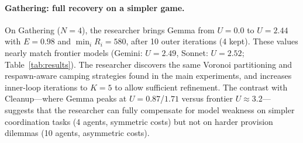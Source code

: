 \documentclass[sigconf,authordraft]{acmart}
\begin{document}
\paragraph{Gathering: full recovery on a simpler game.}
On Gathering ($N{=}4$), the researcher brings Gemma from $U{=}0.0$ to $U{=}2.44$ with $E{=}0.98$ and $\min_i R_i{=}580$, after 10 outer iterations (4 kept). These values nearly match frontier models (Gemini: $U{=}2.49$, Sonnet: $U{=}2.52$; Table~\ref{tab:results}). The researcher discovers the same Voronoi partitioning and respawn-aware camping strategies found in the main experiments, and increases inner-loop iterations to $K{=}5$ to allow sufficient refinement. The contrast with Cleanup---where Gemma peaks at $U{=}0.87$/$1.71$ versus frontier $U{\approx}3.2$---suggests that the researcher can fully compensate for model weakness on simpler coordination tasks (4 agents, symmetric costs) but not on harder provision dilemmas (10 agents, asymmetric costs).
\end{document}
